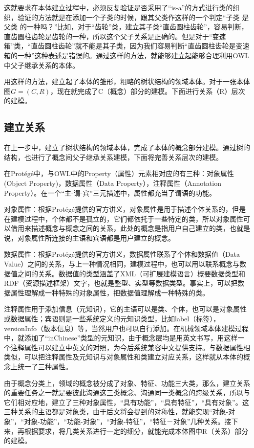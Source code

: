 \documentclass[12pt,a4paper]{article}
\begin{document}
	这就要求在本体建立过程中，必须反复验证是否采用了“is-a”的方式进行类的组织，验证的方法就是在添加一个子类的时候，跟其父类作这样的一个判定“子类 是 父类 的一种吗？”比如，对于“齿轮”类，建立其子类“直齿圆柱齿轮”，容易判断，直齿圆柱齿轮是齿轮的一种，所以这个父子关系是正确的。但是对于“变速箱”类，“直齿圆柱齿轮”就不能是其子类，因为我们容易判断“直齿圆柱齿轮是变速箱的一种”这种表述是错误的。通过这样的方法，就能够建立起能够合理利用OWL中父子继承关系的本体。
	
	用这样的方法，建立起了本体的雏形，粗略的树状结构的领域本体。对于一张本体图$ G=(C,R) $，现在就完成了C（概念）部分的建模。下面进行关系（R）层次的建模。
	
	\subsection{建立关系}
	在上一步中，建立了树状结构的领域本体，完成了本体的概念部分建模。通过树的结构，也进行了概念间父子继承关系建模，下面将完善关系层次的建模。
	
	在Prot{\'e}g{\'e}中，与OWL中的Property（属性）元素相对应的有三种：对象属性(Object Property)，数据属性（Data Property），注释属性（Annotation Property）。在一个“主-谓-宾”三元描述中，属性都充当了谓语的功能。
	
	对象属性：根据Prot{\'e}g{\'e}提供的官方讲义，对象属性是用于描述个体关系的，但是在建模过程中，个体都不是孤立的，它们都依托于一些特定的类，所以对象属性可以借用来描述概念与概念之间的关系，此处的概念是指用户自己建立的类，也就是说，对象属性所连接的主语和宾语都是用户建立的概念。
	
	数据属性：根据Prot{\'e}g{\'e}提供的官方讲义，数据属性联系了个体和数据值（Data Value）之间的关系，与上一种情况相同，建模过程中，也可以用以联系概念与数据值之间的关系。数据值的类型涵盖了XML（可扩展建模语言）概要数据类型和RDF（资源描述框架）文字，也就是整型、实型等数据类型。事实上，可以把数据属性理解成一种特殊的对象属性，把数据值理解成一种特殊的类。
	
	注释属性用于添加信息（元知识），它的主语可以是类、个体，也可以是对象属性或数据属性；宾语则是一些系统定义的元知识类型，比如label（标签），versionInfo（版本信息）等，当然用户也可以自行添加。在机械领域本体建模过程中，就添加了“inChinese”类型的元知识，由于概念层均是用英文书写，用这样一个注释属性可以建立中英文的对照，为今后系统兼容中文提供支持。与数据属性相类似，可以把注释属性及元知识与对象属性和类建立对应关系，这样就从本体的概念上统一了三种属性。
	
	由于概念分类上，领域的概念被分成了对象、特征、功能三大类，那么，建立关系的重要任务之一就是要彼此沟通这三类概念、沟通同一类概念的跨级关系，所以与它们相对应地，建立了三种对象属性，“具有功能”，“具有特征”，“具有对象”。这三种关系的主语都是对象类，由于后文将会提到的对称性，就能实现“对象-对象”，“对象-功能”，“功能-对象”，“对象-特征”，“特征－对象”几种关系。接下来，再根据要求，将几类关系进行一定的细分，就能完成本体图中R（关系）部分的建模。
	
\end{document}
